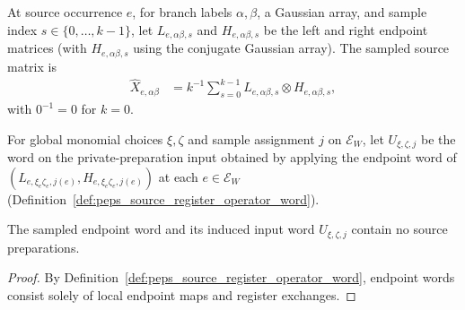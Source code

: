 \begin{definition}
    \label{def:peps_original_sampled_endpoint_factors}
    \leanok
    At source occurrence $e$, for branch labels $\alpha,\beta$, a Gaussian
    array, and sample index $s\in\{0,\ldots,k-1\}$, let $L_{e,\alpha\beta,s}$
    and $H_{e,\alpha\beta,s}$ be the left and right endpoint matrices (with
    $H_{e,\alpha\beta,s}$ using the conjugate Gaussian array). The sampled
    source matrix is
    \begin{align}
        \widehat X_{e,\alpha\beta}
         & =k^{-1}\sum_{s=0}^{k-1}
        L_{e,\alpha\beta,s}\otimes H_{e,\alpha\beta,s},
        \label{eq:peps_sampled_source_endpoints}
    \end{align}
    with $0^{-1}=0$ for $k=0$.
\end{definition}

\begin{definition}
    \label{def:peps_actual_sampled_endpoint_word}
    \leanok
    For global monomial choices $\xi,\zeta$ and sample assignment $j$ on
    $\mathcal E_W$, let $U_{\xi,\zeta,j}$ be the word on the private-preparation
    input obtained by applying the endpoint word of
    $(L_{e,\xi_e\zeta_e,j(e)},H_{e,\xi_e\zeta_e,j(e)})$ at each $e\in\mathcal E_W$
    (Definition~\ref{def:peps_source_register_operator_word}).
\end{definition}

\begin{lemma}
    \label{thm:peps_actual_sampled_endpoint_word_sources}
    \leanok
    The sampled endpoint word and its induced input word $U_{\xi,\zeta,j}$
    contain no source preparations.
\end{lemma}

\begin{proof}\leanok
    By Definition~\ref{def:peps_source_register_operator_word}, endpoint words
    consist solely of local endpoint maps and register exchanges.
\end{proof}

